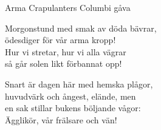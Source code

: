 \begin{song}{Arma Crapulanters Columbi gåva}
	
	
	
	
	Morgonstund med smak av döda bävrar,\\
	ödesdiger för vår arma kropp!\\
	Hur vi stretar, hur vi alla vägrar\\
	så går solen likt förbannat opp!\\
	\begin{repetition}
		Snart är dagen här med hemska plågor,\\
		huvudvärk och ångest, elände, men\\
		en sak stillar bukens böljande vågor:\\
		Ägglikör, vår frälsare och vän!
	\end{repetition}
	
\end{song}
